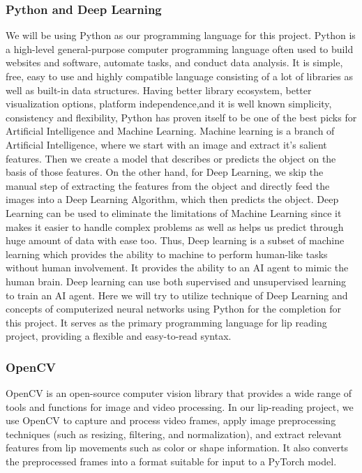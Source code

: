  	\subsubsection{Python and Deep Learning}
We will be using Python as our programming language for this project. Python is a high-level general-purpose computer programming language often used to build websites and software, automate tasks, and conduct data analysis. It is simple, free, easy to use and highly compatible language consisting of a lot of libraries as well as built-in data structures. Having better library ecosystem, better visualization options, platform independence,and it is well known simplicity, consistency and flexibility, Python has proven itself to be one of the best picks for Artificial Intelligence and Machine Learning. Machine learning is a branch of Artificial Intelligence, where we start with an image and extract it’s salient features. Then we create a model that describes or predicts the object on the basis of those features. On the other hand, for Deep Learning, we skip the manual step of extracting the features from the object and directly feed the images into a Deep Learning Algorithm, which then predicts the object. Deep Learning can be used to eliminate the limitations of Machine Learning since it makes it easier to handle complex problems as well as helps us predict through huge amount of data with ease too. Thus, Deep learning is a subset of machine learning which provides the ability to machine to perform human-like tasks without human involvement. It provides the ability to an AI agent to mimic the human brain. Deep learning can use both supervised and unsupervised learning to train an AI agent. Here we will try to utilize technique of Deep Learning and concepts of computerized neural networks using Python for the completion for this project. It serves as the primary programming language for  lip reading project, providing a flexible and easy-to-read syntax.
\subsubsection{OpenCV}
OpenCV is an open-source computer vision library that provides a wide range of tools and functions for image and video processing. In our lip-reading project, we use OpenCV to capture and process video frames, apply image preprocessing techniques (such as resizing, filtering, and normalization), and extract relevant features from lip movements such as color or shape information. It also converts the preprocessed frames into a format suitable for input to a PyTorch model.
\pagebreak
